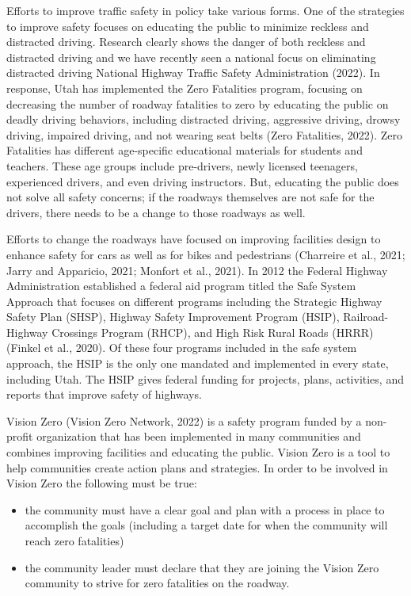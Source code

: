 \documentclass[
  letterpaper,
  DIV=11,
  numbers=noendperiod]{scrreport}
\providecommand{\tightlist}{%
  \setlength{\itemsep}{0pt}\setlength{\parskip}{0pt}}\usepackage{longtable,booktabs,array}
\begin{document}
Efforts to improve traffic safety in policy take various forms. One of
the strategies to improve safety focuses on educating the public to
minimize reckless and distracted driving. Research clearly shows the
danger of both reckless and distracted driving and we have recently seen
a national focus on eliminating distracted driving National Highway
Traffic Safety Administration (2022). In response, Utah has implemented
the Zero Fatalities program, focusing on decreasing the number of
roadway fatalities to zero by educating the public on deadly driving
behaviors, including distracted driving, aggressive driving, drowsy
driving, impaired driving, and not wearing seat belts (Zero Fatalities,
2022). Zero Fatalities has different age-specific educational materials
for students and teachers. These age groups include pre-drivers, newly
licensed teenagers, experienced drivers, and even driving instructors.
But, educating the public does not solve all safety concerns; if the
roadways themselves are not safe for the drivers, there needs to be a
change to those roadways as well.

Efforts to change the roadways have focused on improving facilities
design to enhance safety for cars as well as for bikes and pedestrians
(Charreire et al., 2021; Jarry and Apparicio, 2021; Monfort et al.,
2021). In 2012 the Federal Highway Administration established a federal
aid program titled the Safe System Approach that focuses on different
programs including the Strategic Highway Safety Plan (SHSP), Highway
Safety Improvement Program (HSIP), Railroad-Highway Crossings Program
(RHCP), and High Risk Rural Roads (HRRR) (Finkel et al., 2020). Of these
four programs included in the safe system approach, the HSIP is the only
one mandated and implemented in every state, including Utah. The HSIP
gives federal funding for projects, plans, activities, and reports that
improve safety of highways.

Vision Zero (Vision Zero Network, 2022) is a safety program funded by a
non-profit organization that has been implemented in many communities
and combines improving facilities and educating the public. Vision Zero
is a tool to help communities create action plans and strategies. In
order to be involved in Vision Zero the following must be true:

\begin{itemize}
\tightlist
\item
  the community must have a clear goal and plan with a process in place
  to accomplish the goals (including a target date for when the
  community will reach zero fatalities)
\item
  the community leader must declare that they are joining the Vision
  Zero community to strive for zero fatalities on the roadway.
\end{itemize}
\end{document}
